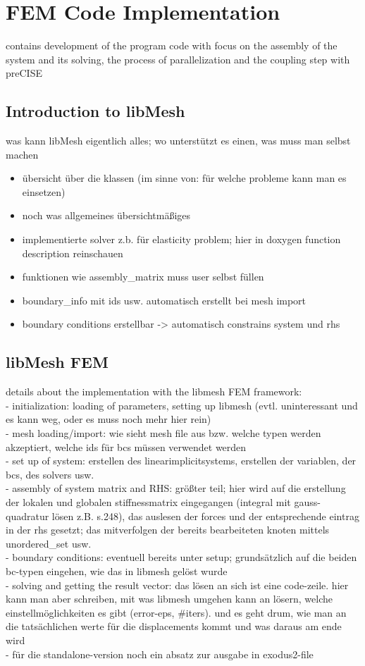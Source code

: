 \section{FEM Code Implementation}
contains development of the program code with focus on the assembly of the system and its solving, the process of parallelization and the coupling step with preCISE
 \subsection{Introduction to libMesh}
 was kann libMesh eigentlich alles; wo unterstützt es einen, was muss man selbst machen
 \begin{itemize}
  \item übersicht über die klassen (im sinne von: für welche probleme kann man es einsetzen)
  \item noch was allgemeines übersichtmäßiges
  \item implementierte solver z.b. für elasticity problem; hier in doxygen function description reinschauen
  \item funktionen wie assembly\_matrix muss user selbst füllen
  \item boundary\_info mit ids usw. automatisch erstellt bei mesh import
  \item boundary conditions erstellbar -> automatisch constrains system und rhs
 \end{itemize}
 \subsection{libMesh FEM}
 details about the implementation with the libmesh FEM framework:\\
 - initialization: loading of parameters, setting up libmesh (evtl. uninteressant und es kann weg, oder es muss noch mehr hier rein)\\
 - mesh loading/import: wie sieht mesh file aus bzw. welche typen werden akzeptiert, welche ids für bcs müssen verwendet werden\\
 - set up of system: erstellen des linearimplicitsystems, erstellen der variablen, der bcs, des solvers usw.\\
 - assembly of system matrix and RHS: größter teil; hier wird auf die erstellung der lokalen und globalen stiffnessmatrix eingegangen (integral mit gauss-quadratur lösen z.B. \cite{steinke2005finite} s.248), das auslesen der forces und der entsprechende eintrag in der rhs gesetzt; das mitverfolgen der bereits bearbeiteten knoten mittels unordered\_set usw.\\
 - boundary conditions: eventuell bereits unter setup; grundsätzlich auf die beiden bc-typen eingehen, wie das in libmesh gelöst wurde\\
 - solving and getting the result vector: das lösen an sich ist eine code-zeile. hier kann man aber schreiben, mit was libmesh umgehen kann an lösern, welche einstellmöglichkeiten es gibt (error-eps, \#iters). und es geht drum, wie man an die tatsächlichen werte für die displacements kommt und was daraus am ende wird\\
 - für die standalone-version noch ein absatz zur ausgabe in exodus2-file
